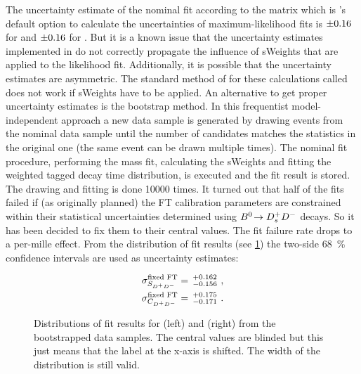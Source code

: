 
The uncertainty estimate of the nominal fit according to the \hesse matrix
which is \root's default option to calculate the uncertainties of
maximum-likelihood fits is $\num{\pm0.16}$ for \SDD and $\num{\pm0.16}$ for
\CDD. But it is a known issue that the uncertainty estimates implemented in
\root do not correctly propagate the influence of sWeights that are applied
to the likelihood fit. Additionally, it is possible that the uncertainty
estimates are asymmetric. The standard method of \root for these calculations
called \minos does not work if sWeights have to be applied. An alternative to get
proper uncertainty estimates is the bootstrap method. In this frequentist
model-independent approach a new data sample is generated by drawing events
from the nominal data sample until the number of candidates matches the
statistics in the original one (the same event can be drawn multiple times).
The nominal fit procedure, \ie performing the mass fit, calculating the
sWeights and fitting the weighted tagged decay time distribution, is executed
and the fit result is stored. The drawing and fitting is done \num{10000}
times. It turned out that half of the fits failed if (as originally planned)
the FT calibration parameters are constrained within their statistical
uncertainties determined using ${{B}^0}\!\rightarrow {\ensuremath{{D}^+_{s}}}{\ensuremath{{D}^-}}$ decays. So it has been decided to fix
them to their central values. The fit failure rate drops to a per-mille
effect. From the distribution of fit results (see
\cref{fig:decaytimefit:bootstrapping}) the two-side \SI{68}{\percent}
confidence intervals are used as uncertainty estimates:

\begin{align}
    \sigma^{\text{fixed FT}}_{S_{{{D}^+}{{D}^-}}} &= \,^{+0.162}_{-0.156} \ , \\
    \sigma^{\text{fixed FT}}_{C_{{{D}^+}{{D}^-}}} &= \,^{+0.175}_{-0.171} \ .
\end{align}

\begin{figure}[!htb]
\centering
\hfill
\caption{Distributions of fit results for \SDD (left) and \CDD (right) from the
bootstrapped data samples. The central values are blinded but this just means
that the label at the x-axis is shifted. The width of the distribution is
still valid.}
\label{fig:decaytimefit:bootstrapping}
\end{figure}

